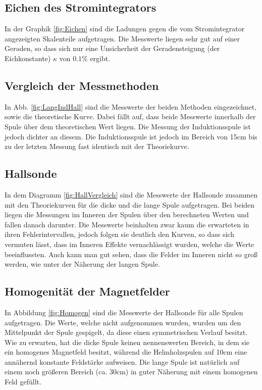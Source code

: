\documentclass[12pt,a4paper,titlepage,headinclude,bibtotoc]{scrartcl}
\begin{document}
\subsection{Eichen des Stromintegrators}
In der Graphik \ref{fig:Eichen} sind die Ladungen gegen die vom Stromintegrator angezeigten Skalenteile aufgetragen.
Die Messwerte liegen sehr gut auf einer Geraden, so dass sich nur eine Unsicherheit der Geradensteigung (der Eichkonstante) $\kappa$ von $0.1\%$ ergibt.

\subsection{Vergleich der Messmethoden}
In Abb. \ref{fig:LangIndHall} sind die Messwerte der beiden Methoden eingezeichnet, sowie die theoretische Kurve.
Dabei fällt auf, dass beide Messwerte innerhalb der Spule über dem theoretischen Wert liegen.
Die Messung der Induktionsspule ist jedoch dichter an diesem.
Die Induktionsspule ist jedoch im Bereich von 15cm bis zu der letzten Messung fast identisch mit der Theoriekurve.

\subsection{Hallsonde}
In dem Diagramm \ref{fig:HallVergleich} sind die Messwerte der Hallsonde zusammen mit den Theoriekurven für die dicke und die lange Spule aufgetragen.
Bei beiden liegen die Messungen im Inneren der Spulen über den berechneten Werten und fallen danach darunter.
Die Messwerte beinhalten zwar kaum die erwarteten in ihren Fehlerintervallen, jedoch folgen sie deutlich den Kurven, so dass sich vermuten lässt, dass im Inneren Effekte vernachlässigt wurden, welche die Werte beeinflussten.
Auch kann man gut sehen, dass die Felder im Inneren nicht so groß werden, wie unter der Näherung der langen Spule.


\subsection{Homogenität der Magnetfelder}
In Abbildung \ref{fig:Homogen} sind die Messwerte der Hallsonde für alle Spulen aufgetragen.
Die Werte, welche nicht aufgenommen wurden, wurden um den Mittelpunkt der Spule gespigelt, da diese einen symmetrischen Verlauf besitzt.
Wie zu erwarten, hat die dicke Spule keinen nennenswerten Bereich, in dem sie ein homogenes Magnetfeld besitzt, während die Helmholzspulen auf 10cm eine annähernd konstante Feldstärke aufweisen.
Die lange Spule ist natürlich auf einem noch größeren Bereich (ca. 30cm) in guter Näherung mit einem homogenen Feld gefüllt.
\end{document}
